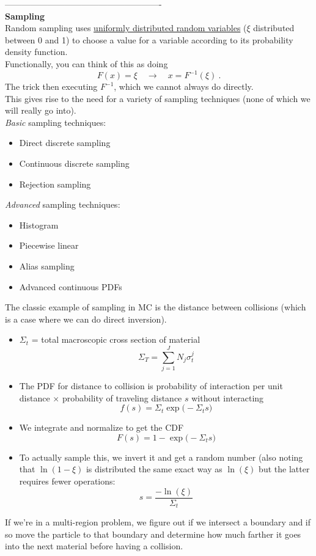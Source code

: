 \documentclass[12pt]{article}
\begin{document}
-------------------------------------------------------\\
\textbf{Sampling}\\
Random sampling uses \underline{uniformly distributed random variables} ($\xi$ distributed between 0 and 1) to choose a value for a variable according to its probability density function.\\
Functionally, you can think of this as doing
\[
F(x) = \xi \quad \rightarrow \quad x = F^{-1}(\xi)\:.
\]
The trick then executing $F^{-1}$, which we cannot always do directly.\\
This gives rise to the need for a variety of sampling techniques (none of which we will really go into).\\
%
\textit{Basic} sampling techniques:
      \begin{itemize}
      \item Direct discrete sampling
      \item Continuous discrete sampling
      \item Rejection sampling
      \end{itemize}
\textit{Advanced }sampling techniques:
      \begin{itemize}
      \item Histogram
      \item Piecewise linear
      \item Alias sampling
      \item Advanced continuous PDFs
      \end{itemize}
%
The classic example of sampling in MC is the distance between collisions (which is a case where we can do direct inversion).
\begin{itemize}
\item $\Sigma_t$ = total macroscopic cross section of material
\[\Sigma_T = \sum_{j=1}^J N_j \sigma_t^j\]
%
\item The PDF for distance to collision is probability of interaction per unit distance $\times$ probability of traveling distance $s$ without interacting
\[f(s) = \Sigma_t \exp\bigl(-\Sigma_t s \bigr)\]
%
\item We integrate and normalize to get the CDF
\[F(s) = 1 - \exp\bigl(-\Sigma_t s \bigr)\]
%
\item To actually sample this, we invert it and get a random number (also noting that $\ln(1-\xi)$ is distributed the same exact way as $\ln(\xi)$ but the latter requires fewer operations:
\[
s = \frac{-\ln(\xi)}{\Sigma_t}
\]
\end{itemize}
%
If we're in a multi-region problem, we figure out if we intersect a boundary and if so move the particle to that boundary and determine how much farther it goes into the next material before having a collision.
\end{document}
